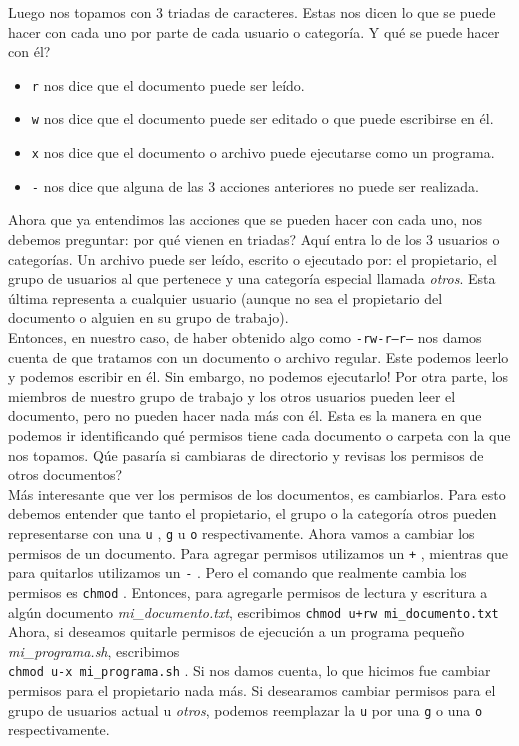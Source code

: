 \documentclass[10pt,letterpaper]{article}
\newcommand{\inlinecode}[1]{
\colorbox{light-gray}{\texttt{#1}}
}
\begin{document}
Luego nos topamos con 3 triadas de caracteres. Estas nos dicen lo que se puede hacer con cada uno por parte de cada usuario o categor\'ia. Y qu\'e se puede hacer con \'el?
\begin{itemize}
\item \inlinecode{r} nos dice que el documento puede ser le\'ido.
\item \inlinecode{w} nos dice que el documento puede ser editado o que puede escribirse en \'el.
\item \inlinecode{x} nos dice que el documento o archivo puede ejecutarse como un programa.
\item \inlinecode{-} nos dice que alguna de las 3 acciones anteriores no puede ser realizada.
\end{itemize}

Ahora que ya entendimos las acciones que se pueden hacer con cada uno, nos debemos preguntar: por qu\'e vienen en triadas? Aqu\'i entra lo de los 3 usuarios o categor\'ias. Un archivo puede ser le\'ido, escrito o ejecutado por: el propietario, el grupo de usuarios al que pertenece y una categor\'ia especial llamada \emph{otros}. Esta \'ultima representa a cualquier usuario (aunque no sea el propietario del documento o alguien en su grupo de trabajo).\\

Entonces, en nuestro caso, de haber obtenido algo como \inlinecode{-rw-r--r--} nos damos cuenta de que tratamos con un documento o archivo regular. Este podemos leerlo y podemos escribir en \'el. Sin embargo, no podemos ejecutarlo! Por otra parte, los miembros de nuestro grupo de trabajo y los otros usuarios pueden leer el documento, pero no pueden hacer nada m\'as con \'el. Esta es la manera en que podemos ir identificando qu\'e permisos tiene cada documento o carpeta con la que nos topamos. Q\'ue pasar\'ia si cambiaras de directorio y revisas los permisos de otros documentos?\\

M\'as interesante que ver los permisos de los documentos, es cambiarlos. Para esto debemos entender que tanto el propietario, el grupo o la categor\'ia otros pueden representarse con una \inlinecode{u}, \inlinecode{g} u \inlinecode{o} respectivamente. Ahora vamos a cambiar los permisos de un documento. Para agregar permisos utilizamos un \inlinecode{+}, mientras que para quitarlos utilizamos un \inlinecode{-}. Pero el comando que realmente cambia los permisos es \inlinecode{chmod}. Entonces, para agregarle permisos de lectura y escritura a alg\'un documento \textit{mi\_documento.txt}, escribimos \inlinecode{chmod u+rw mi\_documento.txt} Ahora, si deseamos quitarle permisos de ejecuci\'on a un programa peque\~no \textit{mi\_programa.sh}, escribimos\\
\inlinecode{chmod u-x mi\_programa.sh}. Si nos damos cuenta, lo que hicimos fue cambiar permisos para el propietario nada m\'as. Si desearamos cambiar permisos para el grupo de usuarios actual u \emph{otros}, podemos reemplazar la \inlinecode{u} por una \inlinecode{g} o una \inlinecode{o} respectivamente.
\end{document}
